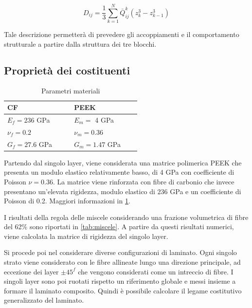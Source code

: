 \documentclass[a4paper,num-refs]{oup-contemporary}
\begin{document}
\begin{equation}
D_{i j}=\frac{1}{3} \sum_{k=1}^{N} \bar{Q}_{i j}^{k}\left(z_{k}^{3}-z_{k-1}^{3}\right)
\label{eq:D}
\end{equation}


Tale descrizione permetterà di prevedere gli accoppiamenti e il comportamento strutturale a partire dalla struttura dei tre blocchi. 


\subsection{Proprietà dei costituenti}

\begin{table}[bt!]
	\centering
	\captionsetup{justification=centering}
	
	\caption{Parametri materiali \citep{Gallagher}}

	\begin{tabular}{ m{0.4\linewidth} m{0.4\linewidth}  }
		\toprule
		CF & PEEK\\
		\midrule
		$E_{f}=236$ GPa & $E_{m}=$ 4 GPa   \\
		$\nu_{f}= 0.2$ & $\nu_{m}= 0.36$ \\
		$G_f=27.6 $ GPa & $G_m=1.47$ GPa \\
		\bottomrule
	\end{tabular}
	\label{tab:parametri}
\end{table}

Partendo dal singolo layer, viene considerata una matrice polimerica PEEK che presenta un modulo elastico relativamente basso, di 4 GPa con coefficiente di Poisson $\nu =0.36$. La matrice  viene rinforzata con fibre di carbonio che invece presentano un'elevata rigidezza, modulo elastico di 236 GPa e un coefficiente di Poisson di 0.2. Maggiori informazioni in \cref{tab:parametri}. 

I risultati della regola delle miscele considerando una frazione volumetrica di fibre del 62\% sono riportati in \cref{tab:miscele}.  A partire da questi risultati numerici, viene calcolata la matrice di rigidezza del singolo layer. 

Si procede poi nel considerare diverse configurazioni di laminato. Ogni singolo strato viene considerato con le fibre allineate lungo una direzione principale, ad eccezione dei layer $\pm 45^f$ che vengono considerati come un intreccio di fibre. I singoli layer sono poi ruotati rispetto un riferimento globale e messi insieme a formare il laminato composito. Quindi è possibile calcolare il legame costitutivo generalizzato del laminato.
\end{document}
